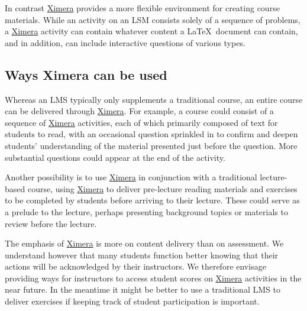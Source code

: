 \documentclass{ximera}
\begin{document}
In contrast \href{http://ximera.osu.edu}{\sf Ximera}
provides a more flexible environment for creating course materials.
While an activity on an LSM consists solely of a sequence
of problems, a \href{http://ximera.osu.edu}{\sf Ximera}
activity can contain whatever content a \LaTeX\ document
can contain, and in addition, can include interactive questions
of various types.

\subsection{Ways Ximera can be used}
Whereas an LMS typically only supplements a traditional course,
an entire course can be delivered through
\href{http://ximera.osu.edu}{\sf Ximera}.
For example, a course could consist of a sequence
of \href{http://ximera.osu.edu}{\sf Ximera}
activities, each of which primarily composed of text
for students to read, with an occasional 
question sprinkled in to confirm and deepen students'
understanding of the material presented just before the question.
More substantial questions could appear at the end of the activity.

Another possibility is to use \href{http://ximera.osu.edu}{\sf Ximera}
in conjunction with a traditional lecture-based course,
using \href{http://ximera.osu.edu}{\sf Ximera}
to deliver pre-lecture reading materials and exercises
to be completed by students before arriving to their lecture.
These could serve as a prelude to the lecture,
perhaps presenting background topics or materials
to review before the lecture.

The emphasis of \href{http://ximera.osu.edu}{\sf Ximera}
is more on content delivery than on assessment.
We understand however that many students function
better knowing that their actions will be acknowledged by
their instructors. We therefore envisage providing ways
for instructors to access student scores on 
\href{http://ximera.osu.edu}{\sf Ximera} activities
in the near future. In the meantime it might
be better to use a traditional LMS to deliver exercises
if keeping track of student participation is important.
\end{document}
